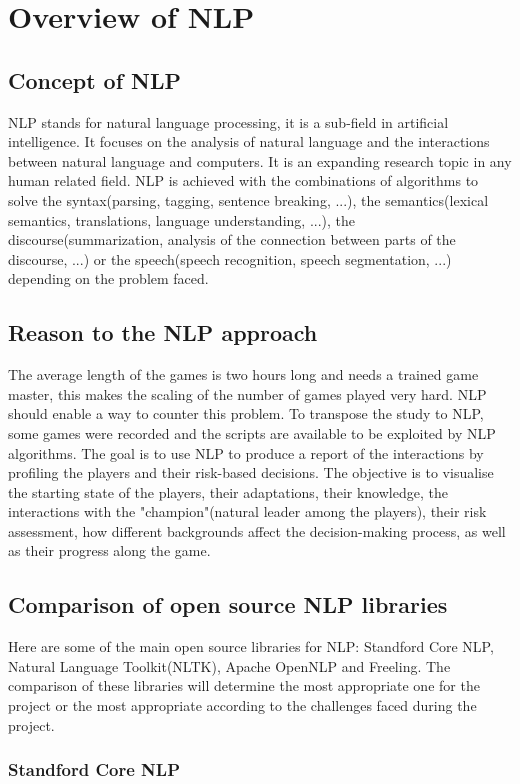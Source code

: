 \documentclass[12pt,journal,compsoc]{IEEEtran}
\begin{document}
\section{Overview of NLP}
\subsection{Concept of NLP}
NLP stands for natural language processing, it is a sub-field in artificial intelligence. It focuses on the analysis of natural language and the interactions between natural language and computers. It is an expanding research topic in any human related field.  NLP is achieved with the combinations of algorithms to solve the syntax(parsing, tagging, sentence breaking, ...), the semantics(lexical semantics, translations, language understanding, ...), the discourse(summarization, analysis of the connection between parts of the discourse, ...) or  the speech(speech recognition, speech segmentation, ...) depending on the problem faced.\cite{def}
\subsection{Reason to the NLP approach}
The average length of the games is two hours long and needs a trained game master, this makes the scaling of the number of games played very hard. NLP should enable a way to counter this problem. To transpose the study to NLP, some games were recorded and the scripts are available to be exploited by NLP algorithms. The goal is to use NLP to produce a report of the interactions by profiling the players and their risk-based decisions. The objective is to visualise the starting state of the players, their adaptations, their knowledge, the interactions with the "champion"(natural leader among the players), their risk assessment, how different backgrounds affect the decision-making process, as well as their progress along the game\cite{DnD}.
\subsection{Comparison of open source NLP libraries}
Here are some of the main open source libraries for NLP:
Standford Core NLP, Natural Language Toolkit(NLTK), Apache OpenNLP and Freeling. The comparison of these libraries will determine the most appropriate one for the project or the most appropriate according to the challenges faced during the project.
\subsubsection{Standford Core NLP}
\end{document}

